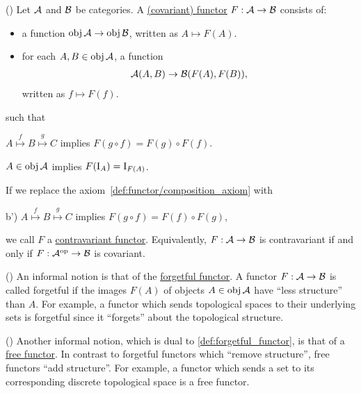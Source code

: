 \begin{definition}\label{def:functor}(\cite[definitions 1.2.1, 1.2.10]{Leinster2014})
  Let $\mathcal A$ and $\mathcal B$ be categories. A \uline{(covariant) functor} $F: \mathcal A \to \mathcal B$ consists of:
  \begin{itemize}
    \item a function $\operatorname{obj} \mathcal A \to \operatorname{obj} \mathcal B$, written as $A \mapsto F(A)$.
    \item for each $A, B \in \operatorname{obj} \mathcal A$, a function
    \begin{align*}
      \mathcal A(A, B) \to \mathcal B(F(A), F(B)),
    \end{align*}
    written as $f \mapsto F(f)$.
  \end{itemize}
  such that
  \begin{defenum}
    \item\label{def:functor/composition_axiom} $A \overset f \mapsto B \overset g \mapsto C$ implies $F(g \circ f) = F(g) \circ F(f)$.
    \item\label{def:functor/identity_axiom} $A \in \operatorname{obj} \mathcal A$ implies $F(\operatorname{I}_A) = \operatorname{I}_{F(A)}$.
  \end{defenum}

  If we replace the axiom~\cref{def:functor/composition_axiom} with
  \begin{defenum}
    \item[b')]\label{def:functor/contravariant_composition_axiom} $A \overset f \mapsto B \overset g \mapsto C$ implies $F(g \circ f) = F(f) \circ F(g)$,
  \end{defenum}
  we call $F$ a \uline{contravariant functor}. Equivalently, $F: \mathcal A \to \mathcal B$ is contravariant if and only if $F: \mathcal A^{\operatorname{op}} \to \mathcal B$ is covariant.
\end{definition}

\begin{definition}\label{def:forgetful_functor}(\cite[example 1.2.3]{Leinster2014})
  An informal notion is that of the \uline{forgetful functor}. A functor $F: \mathcal A \to \mathcal B$ is called forgetful if the images $F(A)$ of objects $A \in \operatorname{obj} \mathcal A$ have \enquote{less structure} than $A$. For example, a functor which sends topological spaces to their underlying sets is forgetful since it \enquote{forgets} about the topological structure.
\end{definition}

\begin{definition}\label{def:free_functor}(\cite[example 1.2.4]{Leinster2014})
  Another informal notion, which is dual to \cref{def:forgetful_functor}, is that of a \uline{free functor}. In contrast to forgetful functors which \enquote{remove structure}, free functors \enquote{add structure}. For example, a functor which sends a set to its corresponding discrete topological space is a free functor.
\end{definition}

